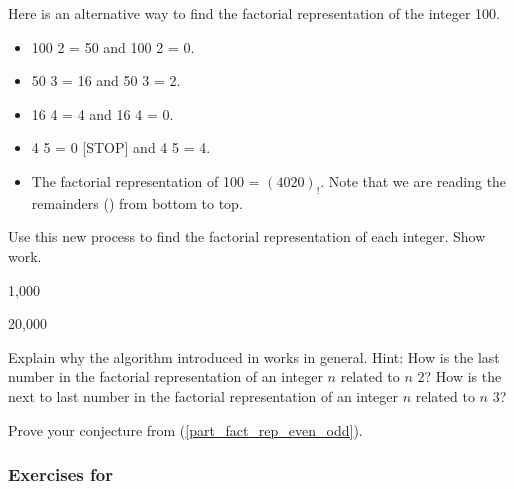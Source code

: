 \begin{exer}[\exerE] %
\label{exer_fact_rep_alg_example}  
    Here is an alternative way to find the factorial representation of the integer 100.
        \begin{itemize}
            \item 100  2 = 50 and 100  2 = 0.
            \item 50  3 = 16 and 50  3 = 2.
            \item 16  4 = 4 and 16  4 = 0.
            \item 4  5 = 0 [STOP] and 4  5 = 4.
            \item The factorial representation of 100 = $(4020)_!$. Note that we are reading the remainders () from bottom to top.
        \end{itemize}
    Use this new process to find the factorial representation of each integer. Show work.
        \begin{exerpart}
            \item 1,000 
            \item 20,000
        \end{exerpart}
\end{exer}

\begin{exer}[\exerE] %
\label{exer_fact_rep_alg_explain}
    Explain why the algorithm introduced in  works in general.  Hint: How is the last number in the factorial representation of an integer $n$ related to $n$  2?  How is the next to last number in the factorial representation of an integer $n$ related to $n$  3?
\end{exer}

\begin{exer}[\exerE] %
\label{exer_fact_rep_even_proof}
    Prove your conjecture from  (\ref{part_fact_rep_even_odd}).
\end{exer}


\subsubsection*{Exercises for  \subsigmapi}


